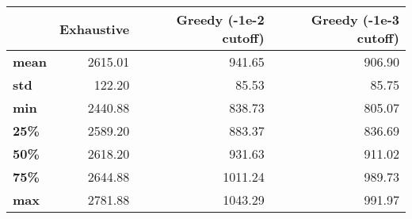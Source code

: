 \begin{tabular}{lrrr}
\toprule
{} &  Exhaustive &  Greedy (-1e-2 cutoff) &  Greedy (-1e-3 cutoff) \\
\midrule
\textbf{mean} &     2615.01 &                 941.65 &                 906.90 \\
\textbf{std } &      122.20 &                  85.53 &                  85.75 \\
\textbf{min } &     2440.88 &                 838.73 &                 805.07 \\
\textbf{25\% } &     2589.20 &                 883.37 &                 836.69 \\
\textbf{50\% } &     2618.20 &                 931.63 &                 911.02 \\
\textbf{75\% } &     2644.88 &                1011.24 &                 989.73 \\
\textbf{max } &     2781.88 &                1043.29 &                 991.97 \\
\bottomrule
\end{tabular}
